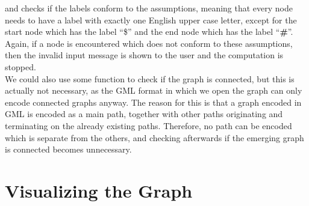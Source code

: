 \documentclass[a4paper,12pt,twoside,BCOR=10mm]{scrbook}
\begin{document}
and checks if the labels conform to the assumptions, meaning that every node needs to have a 
label with exactly one English upper case letter, except for the start node which has the label “\$” and 
the end node which has the label “\textbf{\#}”. 
Again, if a node is encountered which does not conform to these assumptions, then the invalid input message 
is shown to the user and the computation is stopped. \\
We could also use some function to check if the graph is connected, 
but this is actually not necessary, as the GML format in which we open the graph can only encode connected 
graphs anyway. The reason for this is that a graph encoded in GML is encoded as a main path, 
together with other paths originating and terminating on the already existing paths. 
Therefore, no path can be encoded which is separate from the others, and checking afterwards if 
the emerging graph is connected becomes unnecessary.

\section{Visualizing the Graph}
%
\end{document}
